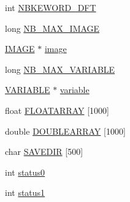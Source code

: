 \begin{DoxyCompactItemize}
\item 
int \hyperlink{structDATA_aece2a33a30b5f15d8250cee2a8f0aa02}{N\+B\+K\+E\+W\+O\+R\+D\+\_\+\+D\+F\+T}
\item 
long \hyperlink{structDATA_a2522406c33b8f890757cfbd8db858f77}{N\+B\+\_\+\+M\+A\+X\+\_\+\+I\+M\+A\+G\+E}
\item 
\hyperlink{structIMAGE}{I\+M\+A\+G\+E} $\ast$ \hyperlink{structDATA_aafd2755d1c0845d9f671d42c916469ed}{image}
\item 
long \hyperlink{structDATA_adbdde6182898eaf675b02e337dc93750}{N\+B\+\_\+\+M\+A\+X\+\_\+\+V\+A\+R\+I\+A\+B\+L\+E}
\item 
\hyperlink{structVARIABLE}{V\+A\+R\+I\+A\+B\+L\+E} $\ast$ \hyperlink{structDATA_a38336f0ef793c2aef2a6f3a20e3e361b}{variable}
\item 
float \hyperlink{structDATA_a58210ca81311d78d220027755351f8b8}{F\+L\+O\+A\+T\+A\+R\+R\+A\+Y} \mbox{[}1000\mbox{]}
\item 
double \hyperlink{structDATA_a15076d931e1bc151a4a9933e09f344b1}{D\+O\+U\+B\+L\+E\+A\+R\+R\+A\+Y} \mbox{[}1000\mbox{]}
\item 
char \hyperlink{structDATA_a883b88f5c5cca024bfc4240cda302dd7}{S\+A\+V\+E\+D\+I\+R} \mbox{[}500\mbox{]}
\item 
int \hyperlink{structDATA_a14eafa363f5cd5dd7ff9ca0744029565}{status0}
\item 
int \hyperlink{structDATA_acc1a46fa384934e24a89660d8d0c9f7a}{status1}
\end{DoxyCompactItemize}


